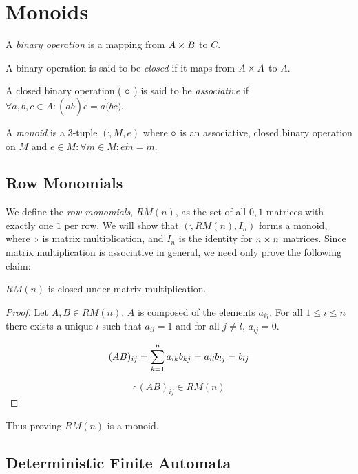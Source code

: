 \chapter{Monoids}

A \emph{binary operation} is a mapping from $A \cross B$ to $ C $.

A binary operation is said to be \emph{closed} if it maps from $A
\cross A$ to $A$.

A closed binary operation ( $ \dot $ ) is said to be
\emph{associative} if $ \forall a,b,c \in A: ( a \dot b ) \dot c = a
\dot ( b \dot c )$.

A \emph{monoid} is a 3-tuple $(\dot, M, e)$ where $\dot$ is an
associative, closed binary operation on $M$ and $ e \in M: \forall m
\in M: e \dot m = m $.

\section{Row Monomials}

We define the \emph{row monomials}, $RM(n)$, as the set of all $0,1$
matrices with exactly one $1$ per row.  We will show that
$(\dot,RM(n),I_n)$ forms a monoid, where $\dot$ is matrix
multiplication, and $I_n$ is the identity for $n \cross n$ matrices.
Since matrix multiplication is associative in general, we need only
prove the following claim:

\begin{claim}

  $RM(n)$ is closed under matrix multiplication.

\end{claim}

\begin{proof}

  Let $A,B \in RM(n)$.  $A$ is composed of the elements $a_{ij}$.  For
  all $1 \leq i \leq n$ there exists a unique $l$ such that $a_{il} =
  1$ and for all $j \neq l$, $a_{ij} = 0$.

  \[
  (AB)_{ij} = \summ{k=1}{n} a_{ik}b_{kj} = a_{il}b_{lj} = b_{lj}
  \]

  \[
  \therefore (AB)_{ij} \in RM(n)
  \]
  
\end{proof}

Thus proving $RM(n)$ is a monoid.

\section{Deterministic Finite Automata}

